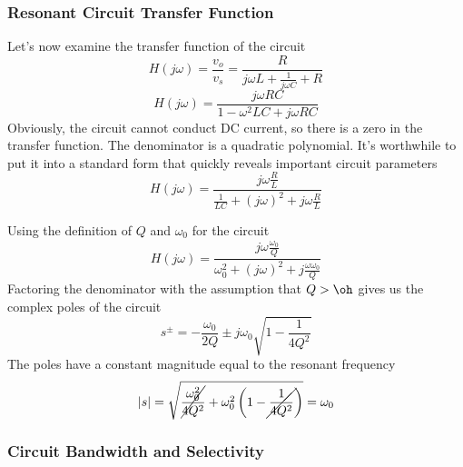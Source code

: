 
\subsubsection{Resonant Circuit Transfer Function}

Let's now examine the transfer function of the circuit
\begin{equation}
    H(j\omega) = \frac{v_o}{v_s} = \frac{R}{j\omega L + \frac{1}{j\omega C} +
      R}
\end{equation}
\begin{equation}
    H(j\omega) = \frac{j\omega R C }{1 - \omega^2 LC + j\omega R C}
\end{equation}
 Obviously, the circuit cannot conduct DC current, so there is a
  zero in the transfer function.  The denominator is a quadratic
  polynomial.  It's worthwhile to put it into a standard form that
  quickly reveals important circuit parameters
\begin{equation}
    H(j\omega) = \frac{j\omega \frac{R}{L} }{\frac{1}{LC} +  (j\omega)^2 +
      j\omega \frac{R}{L}}
\end{equation}

Using the definition of $Q$ and $\omega_0$ for the circuit
%
\begin{equation}
    H(j\omega) = \frac{j\omega \frac{\omega_0}{Q} }{\omega_0^2 +  (j\omega)^2 +
      j \frac{\omega\omega_0}{Q}}
\end{equation}
%
 Factoring the denominator with the assumption that $Q > \oh$ gives us the
complex poles of the circuit
%
\begin{equation}
    s^\pm = -\frac{\omega_0}{2 Q} \pm j\omega_0 \sqrt{1 - \frac{1}{4Q^2}}
\end{equation}
%
 The poles have a constant magnitude equal to the resonant frequency
\begin{equation}
    |s| = \sqrt{
    \cancel{\frac{\omega_0^2}{4 Q^2}} 
      + \omega_0^2 \left(1 -
      \cancel{\frac{1}{4Q^2}}
          \right)} = \omega_0
\end{equation}




\subsubsection{Circuit Bandwidth and Selectivity}

